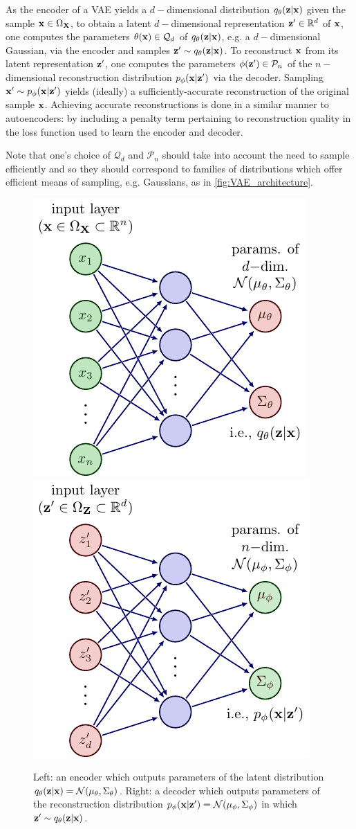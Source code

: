 \documentclass[11pt]{article}
\begin{document}
As the encoder of a VAE yields a $d-$dimensional distribution $q_{\theta}(\mathbf{z}|\mathbf{x})$ given the sample $\mathbf{x}\in\Omega_{\mathbf{X}}$, to obtain a latent $d-$dimensional representation $\mathbf{z}'\in\mathbb{R}^d$ of $\mathbf{x}$, one computes the parameters $\theta(\mathbf{x})\in\mathcal{Q}_d$ of $q_{\theta}(\mathbf{z}|\mathbf{x})$, e.g. a $d-$dimensional Gaussian, via the encoder and samples $\mathbf{z}'\sim q_{\theta}(\mathbf{z}|\mathbf{x})$. To reconstruct $\mathbf{x}$ from its latent representation $\mathbf{z}'$, one computes the parameters $\phi(\mathbf{z}')\in\mathcal{P}_n$ of the $n-$dimensional reconstruction distribution $p_{\phi}(\mathbf{x}|\mathbf{z}')$ via the decoder. Sampling $\mathbf{x}'\sim p_{\phi}(\mathbf{x}|\mathbf{z}')$ yields (ideally) a sufficiently-accurate reconstruction of the original sample $\mathbf{x}$. Achieving accurate reconstructions is done in a similar manner to autoencoders: by including a penalty term pertaining to reconstruction quality in the loss function used to learn the encoder and decoder.

Note that one's choice of $\mathcal{Q}_d$ and $\mathcal{P}_n$ should take into account the need to sample efficiently and so they should correspond to families of distributions which offer efficient means of sampling, e.g. Gaussians, as in \autoref{fig:VAE_architecture}.

\begin{figure}[t]
    \centering
    \includegraphics[width=0.46\linewidth]{figures/generative_models/VAE_encoder.pdf}
    \hspace{20pt}
    \includegraphics[width=0.46\linewidth]{figures/generative_models/VAE_decoder.pdf}
    \caption{Left: an encoder which outputs parameters of the latent distribution $q_{\theta}(\mathbf{z}|\mathbf{x})=\mathcal{N}(\mu_{\theta},\Sigma_{\theta})$. Right: a decoder which outputs parameters of the reconstruction distribution $p_{\phi}(\mathbf{x}|\mathbf{z}')=\mathcal{N}(\mu_{\phi},\Sigma_{\phi})$ in which $\mathbf{z}'\sim q_{\theta}(\mathbf{z}|\mathbf{x})$.}
    \label{fig:VAE_architecture}
\end{figure}
\end{document}
